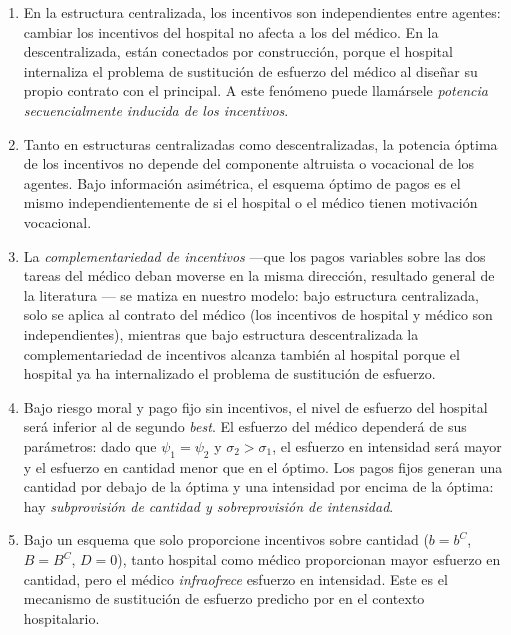 \documentclass[12pt, a4paper, twoside, openright]{book}
\theoremstyle{plain}
\theoremstyle{definition}
\theoremstyle{remark}
\begin{document}
\begin{enumerate}[label=(\roman*)]
  \item En la estructura centralizada, los incentivos son independientes entre agentes: cambiar los incentivos del hospital no afecta a los del médico. En la descentralizada, están conectados por construcción, porque el hospital internaliza el problema de sustitución de esfuerzo del médico al diseñar su propio contrato con el principal. A este fenómeno puede llamársele \textit{potencia secuencialmente inducida de los incentivos}.

  \item Tanto en estructuras centralizadas como descentralizadas, la potencia óptima de los incentivos no depende del componente altruista o vocacional de los agentes. Bajo información asimétrica, el esquema óptimo de pagos es el mismo independientemente de si el hospital o el médico tienen motivación vocacional.

  \item La \textit{complementariedad de incentivos} ---que los pagos variables sobre las dos tareas del médico deban moverse en la misma dirección, resultado general de la literatura \citep[p.\ 222]{bolton2005}--- se matiza en nuestro modelo: bajo estructura centralizada, solo se aplica al contrato del médico (los incentivos de hospital y médico son independientes), mientras que bajo estructura descentralizada la complementariedad de incentivos alcanza también al hospital porque el hospital ya ha internalizado el problema de sustitución de esfuerzo.

  \item Bajo riesgo moral y pago fijo sin incentivos, el nivel de esfuerzo del hospital será inferior al de segundo \textit{best}. El esfuerzo del médico dependerá de sus parámetros: dado que $\psi_1=\psi_2$ y $\sigma_2>\sigma_1$, el esfuerzo en intensidad será mayor y el esfuerzo en cantidad menor que en el óptimo. Los pagos fijos generan una cantidad por debajo de la óptima y una intensidad por encima de la óptima: hay \textit{subprovisión de cantidad y sobreprovisión de intensidad}.

  \item Bajo un esquema que solo proporcione incentivos sobre cantidad ($b=b^C$, $B=B^C$, $D=0$), tanto hospital como médico proporcionan mayor esfuerzo en cantidad, pero el médico \textit{infraofrece} esfuerzo en intensidad. Este es el mecanismo de sustitución de esfuerzo predicho por \citet{holmstrom1991} en el contexto hospitalario.


\end{enumerate}
\end{document}
